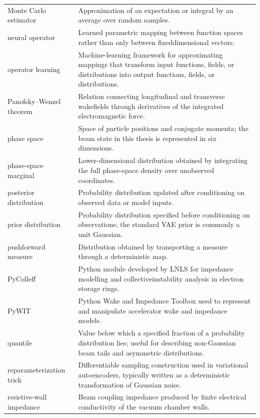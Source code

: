 \begin{longtable}{@{}p{}@{}p{}@{}}
Monte Carlo estimator & Approximation of an expectation or integral by an average over random samples.\\
\noalign{\vskip\baselineskip}
neural operator & Learned parametric mapping between function spaces rather than only between fixeddimensional vectors.\\
\noalign{\vskip\baselineskip}
operator learning & Machine-learning framework for approximating mappings that transform input functions, fields, or distributions into output functions, fields, or distributions.\\
\noalign{\vskip\baselineskip}
Panofsky–Wenzel theorem & Relation connecting longitudinal and transverse wakefields through derivatives of the integrated electromagnetic force.\\
phase space & Space of particle positions and conjugate momenta; the beam state in this thesis is represented in six dimensions.\\
phase-space marginal & Lower-dimensional distribution obtained by integrating the full phase-space density over unobserved coordinates.\\
posterior distribution & Probability distribution updated after conditioning on observed data or model inputs.\\
prior distribution & Probability distribution specified before conditioning on observations; the standard VAE prior is commonly a unit Gaussian.\\
pushforward measure & Distribution obtained by transporting a measure through a deterministic map.\\
PyColleff & Python module developed by LNLS for impedance modelling and collectiveinstability analysis in electron storage rings.\\
PyWIT & Python Wake and Impedance Toolbox used to represent and manipulate accelerator wake and impedance models.\\
\noalign{\vskip\baselineskip}
quantile & Value below which a specified fraction of a probability distribution lies; useful for describing non-Gaussian beam tails and asymmetric distributions.\\
\noalign{\vskip\baselineskip}
reparameterization trick & Differentiable sampling construction used in variational autoencoders, typically written as a deterministic transformation of Gaussian noise.\\
resistive-wall impedance & Beam coupling impedance produced by finite electrical conductivity of the vacuum chamber walls.\\

\end{longtable}
